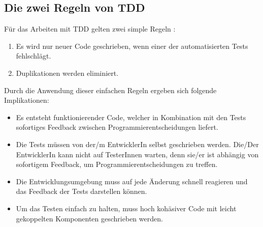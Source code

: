 \subsection{Die zwei Regeln von TDD}
Für das Arbeiten mit TDD gelten zwei simple Regeln \autocite[ix]{Beck:2003}:
\begin{enumerate}
  \item Es wird nur neuer Code geschrieben, wenn einer der automatisierten Tests fehlschlägt.
  \item Duplikationen werden eliminiert.
\end{enumerate}
Durch die Anwendung dieser einfachen Regeln ergeben sich folgende Implikationen:
\begin{itemize}
  \item Es entsteht funktionierender Code, welcher in Kombination mit den Tests sofortiges Feedback zwischen Programmierentscheidungen liefert.
  \item Die Tests müssen von der/m EntwicklerIn selbst geschrieben werden. Die/Der EntwicklerIn kann nicht auf TesterInnen warten, denn sie/er ist abhängig von sofortigem Feedback, um Programmierentscheidungen zu treffen.
  \item Die Entwicklungsumgebung muss auf jede Änderung schnell reagieren und das Feedback der Tests darstellen können.
  \item Um das Testen einfach zu halten, muss hoch kohäsiver Code mit leicht gekoppelten Komponenten geschrieben werden.
\end{itemize}

